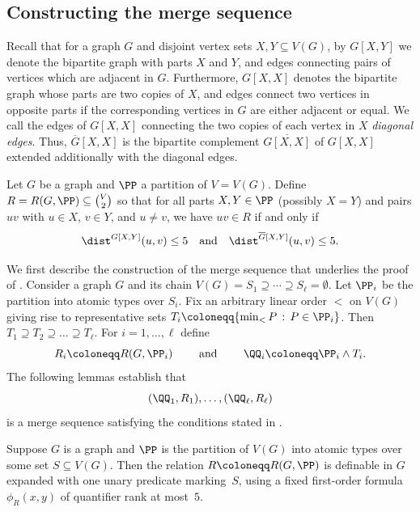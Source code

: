 \subsection{Constructing the merge sequence}

Recall that for a graph
$G$ and disjoint vertex sets $X,Y\subseteq V(G)$,
by $G[X,Y]$ we denote the bipartite graph with parts $X$ and $Y$, and edges connecting pairs of vertices which are adjacent in $G$.
Furthermore, $G[X,X]$
denotes the bipartite graph whose parts are two copies of $X$,
and edges connect two vertices in opposite parts if the corresponding vertices in $G$ are either adjacent or equal.
We call the edges of $G[X,X]$ connecting the two copies of each vertex in $X$ \emph{diagonal edges}.
Thus,
${\overline G[X,X]}$ is the bipartite complement  $\overline {G[X,X]}$ of $G[X,X]$ extended additionally with the diagonal edges.

\begin{definition}
    Let $G$ be a graph and $\PP$ a partition of $V = V(G)$.
    Define $R = R(G,\PP) \subseteq \binom{V}{2}$ so that for all parts $X,Y \in \PP$ (possibly $X = Y$) and pairs $uv$ with $u \in X$, $v \in Y$, and $u \ne v$, we have
    $uv \in R$ if and only if
    \[
    \dist^{G[X,Y]}(u,v) \le 5 \quad \text{and} \quad \dist^{\overline{G}[X,Y]}(u,v) \le 5. \]
\end{definition}

We first describe the construction of the merge sequence that underlies the proof of .
Consider a graph $G$ and its chain
    $V(G)=S_1\supseteq\cdots\supseteq S_\ell=\emptyset$.
    Let $\PP_i$ be the partition into atomic types over $S_i$.
    Fix an arbitrary linear order $<$ on $V(G)$
    giving rise to representative sets $T_i \coloneqq \{\min_< P \,:\, P \in \PP_i\}$.
    Then $T_1\supseteq T_2\supseteq \dots \supseteq T_\ell$.
    For $i=1,\ldots,\ell$ define $$R_i \coloneqq R(G,\PP_i)\qquad\text{ and }\qquad\QQ_i \coloneqq \PP_i \wedge T_i.$$
    The following lemmas establish that
    $$(\QQ_1,R_1),\ldots,(\QQ_\ell,R_\ell)$$ is a merge sequence satisfying the conditions stated in .

\begin{lemma}\label{lem:def-R}
    Suppose $G$ is a graph and $\PP$ is the partition of $V(G)$ into atomic types over some set $S \subseteq V(G)$. Then the relation $R \coloneqq R(G,\PP)$ is definable in $G$ expanded with one unary predicate marking~$S$, using a fixed first-order formula $\phi_R(x,y)$ of quantifier rank at most~$5$.
\end{lemma}

